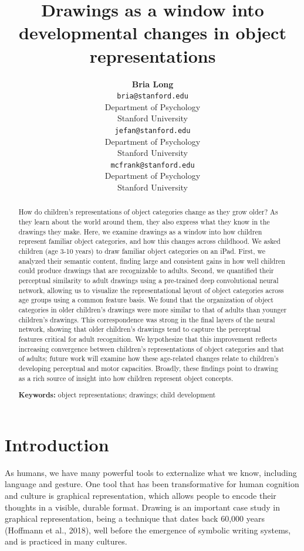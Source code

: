 \documentclass[10pt, letterpaper]{article}
\title{Drawings as a window into developmental changes in object
representations}
\author{{\large \bf Bria Long} \\ \texttt{bria@stanford.edu} \\ Department of Psychology \\ Stanford University \And {\large \bf Judith E. Fan} \\ \texttt{jefan@stanford.edu} \\ Department of Psychology \\ Stanford University \And {\large \bf Michael C. Frank } \\ \texttt{mcfrank@stanford.edu} \\ Department of Psychology \\ Stanford University}
\begin{document}
\maketitle

\begin{abstract}
How do children's representations of object categories change as they
grow older? As they learn about the world around them, they also express
what they know in the drawings they make. Here, we examine drawings as a
window into how children represent familiar object categories, and how
this changes across childhood. We asked children (age 3-10 years) to
draw familiar object categories on an iPad. First, we analyzed their
semantic content, finding large and consistent gains in how well
children could produce drawings that are recognizable to adults. Second,
we quantified their perceptual similarity to adult drawings using a
pre-trained deep convolutional neural network, allowing us to visualize
the representational layout of object categories across age groups using
a common feature basis. We found that the organization of object
categories in older children's drawings were more similar to that of
adults than younger children's drawings. This correspondence was strong
in the final layers of the neural network, showing that older children's
drawings tend to capture the perceptual features critical for adult
recognition. We hypothesize that this improvement reflects increasing
convergence between children's representations of object categories and
that of adults; future work will examine how these age-related changes
relate to children's developing perceptual and motor capacities.
Broadly, these findings point to drawing as a rich source of insight
into how children represent object concepts.

\textbf{Keywords:}
object representations; drawings; child development
\end{abstract}

\newcommand{\wrapmf}[1]{#1} 





\section{Introduction}\label{introduction}

As humans, we have many powerful tools to externalize what we know,
including language and gesture. One tool that has been transformative
for human cognition and culture is graphical representation, which
allows people to encode their thoughts in a visible, durable format.
Drawing is an important case study in graphical representation, being a
technique that dates back 60,000 years (Hoffmann et al., 2018), well
before the emergence of symbolic writing systems, and is practiced in
many cultures.
\end{document}
